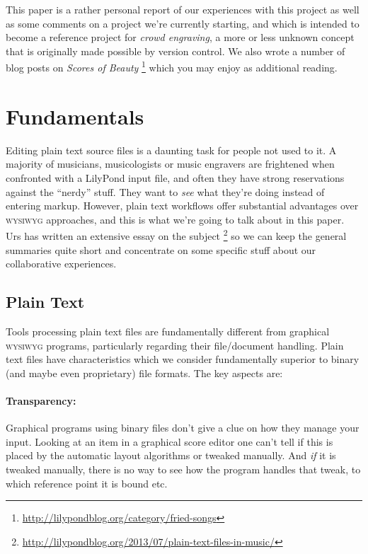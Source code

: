\documentclass[11pt,a4paper]{article}
\begin{document}
\medskip
This paper is a rather personal report of our experiences with this project as well as
some comments on a project we're currently starting, and which is intended to become
a reference project for \emph{crowd engraving}, a more or less unknown concept that is
originally made possible by version control. We also wrote a number of blog posts on
\emph{Scores of Beauty}%
\footnote{\url{http://lilypondblog.org/category/fried-songs}}
which you may enjoy as additional reading.

\section{Fundamentals}
Editing plain text source files is a daunting task for people not used to it.
A majority of musicians, musicologists or music engravers are frightened when
confronted with a LilyPond input file, and often they have strong reservations
against the “nerdy” stuff. They want to \emph{see} what they're doing instead of entering
markup. However, plain text workflows offer substantial advantages over \textsc{wysiwyg}
approaches, and this is what we're going to talk about in this paper. Urs has written
an extensive essay on the subject%
\footnote{\url{http://lilypondblog.org/2013/07/plain-text-files-in-music/}}
so we can keep the general summaries quite short and concentrate on some specific stuff
about our collaborative experiences.

\subsection{Plain Text}
Tools processing plain text files are fundamentally different from graphical
\textsc{wysiwyg} programs, particularly regarding their file/document handling.
Plain text files have characteristics which we consider fundamentally superior to
binary (and maybe even proprietary) file formats. The key aspects are:

\paragraph{Transparency:}
Graphical programs using binary files don't give a clue on how they manage your input.
Looking at an item in a graphical score editor one can't tell if this is placed by the
automatic layout algorithms or tweaked manually. And \emph{if} it is tweaked manually,
there is no way to see how the program handles that tweak, to which reference point it
is bound etc.
\end{document}

